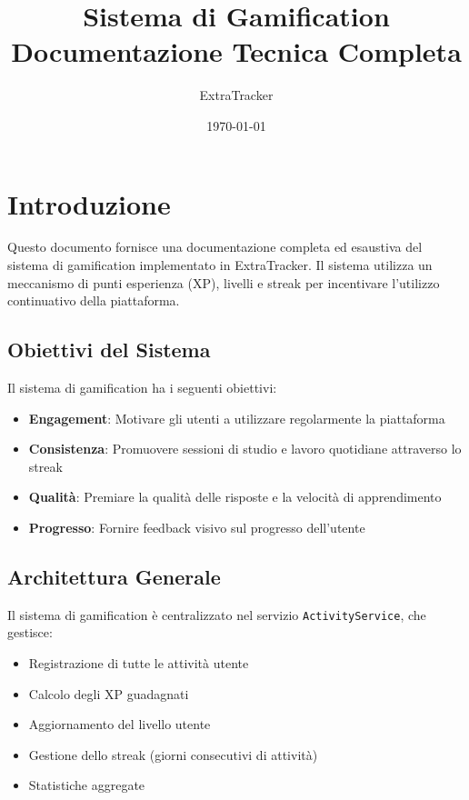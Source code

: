 \documentclass[11pt,a4paper]{article}
\title{Sistema di Gamification\\
\large Documentazione Tecnica Completa}
\author{ExtraTracker}
\date{\today}
\begin{document}
\maketitle
\tableofcontents
\newpage

\section{Introduzione}

Questo documento fornisce una documentazione completa ed esaustiva del sistema di gamification implementato in ExtraTracker. Il sistema utilizza un meccanismo di punti esperienza (XP), livelli e streak per incentivare l'utilizzo continuativo della piattaforma.

\subsection{Obiettivi del Sistema}

Il sistema di gamification ha i seguenti obiettivi:
\begin{itemize}
    \item \textbf{Engagement}: Motivare gli utenti a utilizzare regolarmente la piattaforma
    \item \textbf{Consistenza}: Promuovere sessioni di studio e lavoro quotidiane attraverso lo streak
    \item \textbf{Qualità}: Premiare la qualità delle risposte e la velocità di apprendimento
    \item \textbf{Progresso}: Fornire feedback visivo sul progresso dell'utente
\end{itemize}

\subsection{Architettura Generale}

Il sistema di gamification è centralizzato nel servizio \texttt{ActivityService}, che gestisce:
\begin{itemize}
    \item Registrazione di tutte le attività utente
    \item Calcolo degli XP guadagnati
    \item Aggiornamento del livello utente
    \item Gestione dello streak (giorni consecutivi di attività)
    \item Statistiche aggregate
\end{itemize}
\end{document}
